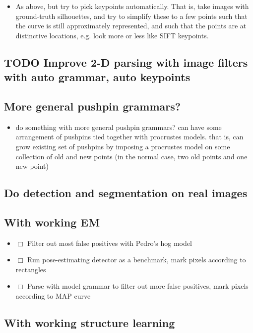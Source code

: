 \documentclass{book}
\begin{document}
\begin{itemize}
\item As above, but try to pick keypoints automatically. That is, take
    images with ground-truth silhouettes, and try to simplify these to
    a few points such that the curve is still approximately
    represented, and such that the points are at distinctive
    locations, e.g. look more or less like SIFT keypoints.
\end{itemize}
\subsection{\textbf{TODO} Improve 2-D parsing with image filters with auto grammar, auto keypoints}
\label{sec-7_27_10}
\subsection{More general pushpin grammars?}
\label{sec-7_27_11}

\begin{itemize}
\item do something with more general pushpin grammars? can have some
    arrangement of pushpins tied together with procrustes models. that
    is, can grow existing set of pushpins by imposing a procrustes
    model on some collection of old and new points (in the normal
    case, two old points and one new point)
\end{itemize}
\subsection{Do detection and segmentation on real images}
\label{sec-7_27_12}
\subsection{With working EM}
\label{sec-7_27_13}

\begin{itemize}
\item $\Box$ Filter out most false positives with Pedro's hog model
\item $\Box$ Run pose-estimating detector as a benchmark, mark pixels according to rectangles
\item $\Box$ Parse with model grammar to filter out more false positives, mark pixels according to MAP curve
\end{itemize}
\subsection{With working structure learning}
\label{sec-7_27_14}
\end{document}

